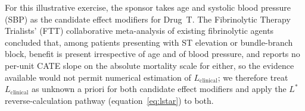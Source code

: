 \documentclass[AMA,Times1COL]{WileyNJDv5}
\begin{document}
For this illustrative exercise, the sponsor takes age and systolic blood pressure (SBP) as the candidate effect modifiers for Drug~T. The Fibrinolytic Therapy Trialists' (FTT) collaborative meta-analysis of existing fibrinolytic agents\cite{ftt1994} concluded that, among patients presenting with ST elevation or bundle-branch block, benefit is present irrespective of age and of blood pressure, and reports no per-unit CATE slope on the absolute mortality scale for either, so the evidence available would not permit numerical estimation of $L_{\text{clinical}}$; we therefore treat $L_{\text{clinical}}$ as unknown a priori for both candidate effect modifiers and apply the $L^*$ reverse-calculation pathway (equation~\ref{eq:lstar}) to both.
\end{document}
